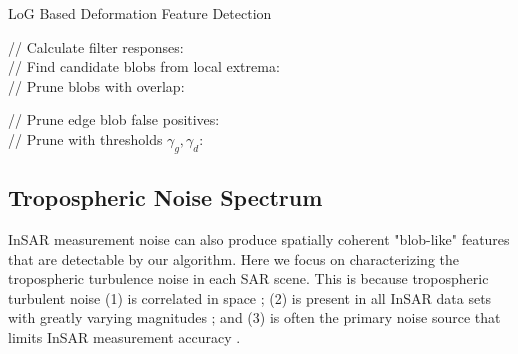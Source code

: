 \begin{algorithm}
	\caption{LoG Based Deformation Feature Detection}\label{algo:blobs}
	\SetAlgoLined
	
	// Calculate filter responses:\\
	// Find candidate blobs from local extrema:\\
	\For{$ (i, j, m) \in  L $}{
		\If{$L[i, j, m] $ is local extremum }{
				Compute $ r = \sqrt{2}\sigma_m $ \\
				Add $ (i, j, r) $ to list of candidate detections
			}
		}
		// Prune blobs with overlap:\\
		
		// Prune edge blob false positives:\\
		// Prune with thresholds $ \gamma_g, \gamma_d $:\\
	\end{algorithm}
	
	
	
	\subsection{Tropospheric Noise Spectrum}
	\label{subsec:methods-2-tropo-spectrum}
	InSAR measurement noise can also produce spatially coherent "blob-like" features that are detectable by our algorithm.  Here we focus on characterizing the tropospheric turbulence noise in each SAR scene. This is because tropospheric turbulent noise (1) is correlated in space \cite{Emardson2003NeutralAtmosphericDelay, Lohman2005SomeThoughtsUse}; (2) is present in all InSAR data sets with greatly varying magnitudes \cite{Barnhart2013CharacterizingEstimatingNoise, Hooper2012RecentAdvancesSar}; and (3) is often the primary noise source that limits InSAR measurement accuracy \cite{Jolivet2014ImprovingInsarGeodesy, Bekaert2015StatisticalComparisonInsar, Parker2015SystematicAssessmentAtmospheric}.
	
